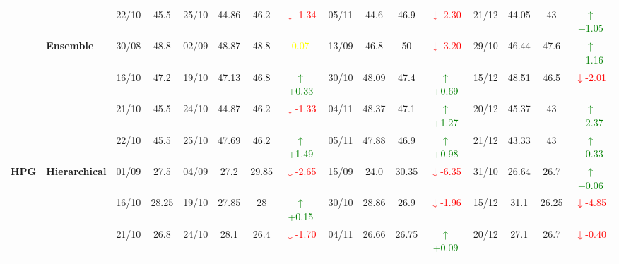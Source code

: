 \documentclass{ieeeaccess}
\begin{document}
{\begin{longtable}{llcc|cccc|cccc|cccc}
&
& 22/10 & 45.5 & 25/10 & 44.86 & 46.2 & \textcolor{red}{\(\downarrow\)-1.34} & 05/11 & 44.6 & 46.9 & \textcolor{red}{\(\downarrow\)-2.30} & 21/12 & 44.05 & 43 & \textcolor{green}{\(\uparrow\)+1.05} \\
\cmidrule(lr){2-16}



& \textbf{Ensemble}
& 30/08 & 48.8 & 02/09 & 48.87 & 48.8 & \textcolor{yellow}{0.07} & 13/09 & 46.8 & 50 & \textcolor{red}{\(\downarrow\)-3.20} & 29/10 & 46.44 & 47.6 & \textcolor{green}{\(\uparrow\)+1.16} \\

&
& 16/10 & 47.2 & 19/10 & 47.13 & 46.8 & \textcolor{green}{\(\uparrow\)+0.33} & 30/10 & 48.09 & 47.4 & \textcolor{green}{\(\uparrow\)+0.69} & 15/12 & 48.51 & 46.5 & \textcolor{red}{\(\downarrow\)-2.01} \\

&
& 21/10 & 45.5 & 24/10 & 44.87 & 46.2 & \textcolor{red}{\(\downarrow\)-1.33} & 04/11 & 48.37 & 47.1 & \textcolor{green}{\(\uparrow\)+1.27} & 20/12 & 45.37 & 43 & \textcolor{green}{\(\uparrow\)+2.37} \\

&
& 22/10 & 45.5 & 25/10 & 47.69 & 46.2 & \textcolor{green}{\(\uparrow\)+1.49} & 05/11 & 47.88 & 46.9 & \textcolor{green}{\(\uparrow\)+0.98} & 21/12 & 43.33 & 43 & \textcolor{green}{\(\uparrow\)+0.33} \\
\midrule


\multirow{12}{*}{\textbf{HPG}} 
& \textbf{Hierarchical}
& 01/09 & 27.5 & 04/09 & 27.2 & 29.85 & \textcolor{red}{\(\downarrow\)-2.65} & 15/09 & 24.0 & 30.35 & \textcolor{red}{\(\downarrow\)-6.35} & 31/10 & 26.64 & 26.7 & \textcolor{green}{\(\uparrow\)+0.06} \\

& 
& 16/10 & 28.25 & 19/10 & 27.85 & 28 & \textcolor{green}{\(\uparrow\)+0.15} & 30/10 & 28.86 & 26.9 & \textcolor{red}{\(\downarrow\)-1.96} & 15/12 & 31.1 & 26.25 & \textcolor{red}{\(\downarrow\)-4.85} \\

& 
& 21/10 & 26.8 & 24/10 & 28.1 & 26.4 & \textcolor{red}{\(\downarrow\)-1.70} & 04/11 & 26.66 & 26.75 & \textcolor{green}{\(\uparrow\)+0.09} & 20/12 & 27.1 & 26.7 & \textcolor{red}{\(\downarrow\)-0.40} \\


\end{longtable}}
\end{document}
